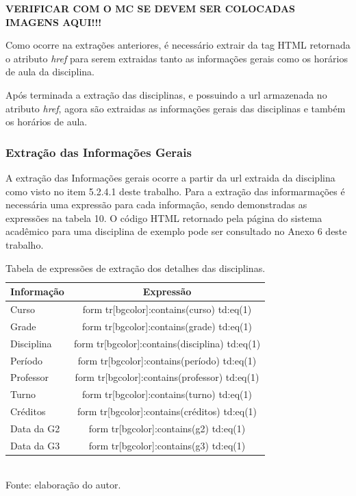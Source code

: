 \textbf{VERIFICAR COM O MC SE DEVEM SER COLOCADAS IMAGENS AQUI!!!}

Como ocorre na extrações anteriores, é necessário extrair da tag HTML retornada o atributo \emph{href} para serem extraidas tanto as informações gerais como os horários de aula da disciplina.

Após terminada a extração das disciplinas, e possuindo a url armazenada no atributo \emph{href}, agora são extraidas as informações gerais das disciplinas e também os horários de aula.

\subsubsection{Extração das Informações Gerais}
A extração das Informações gerais ocorre a partir da url extraida da disciplina como visto no item 5.2.4.1 deste trabalho. Para a extração das informarmações é necessária uma expressão para cada informação, sendo demonstradas as expressões na tabela 10. O código HTML retornado pela página do sistema acadêmico para uma disciplina de exemplo pode ser consultado no Anexo 6 deste trabalho.

\begin{table}[!hbt]
\centering
\caption[Extração de Informações - Expressões de Extração dos Detalhes da Disciplina]{Tabela de expressões de extração dos detalhes das disciplinas.}
\vspace{3mm}
\begin{tabular}{p{3cm}|c}\hline
\bf{Informação} & \bf{Expressão}                                 \\ \hline
Curso           & form tr[bgcolor]:contains(curso) td:eq(1)      \\ \hline
Grade           & form tr[bgcolor]:contains(grade) td:eq(1)      \\ \hline
Disciplina      & form tr[bgcolor]:contains(disciplina) td:eq(1) \\ \hline
Período         & form tr[bgcolor]:contains(período) td:eq(1)    \\ \hline
Professor       & form tr[bgcolor]:contains(professor) td:eq(1)  \\ \hline
Turno           & form tr[bgcolor]:contains(turno) td:eq(1)      \\ \hline
Créditos        & form tr[bgcolor]:contains(créditos) td:eq(1)   \\ \hline
Data da G2      & form tr[bgcolor]:contains(g2) td:eq(1)         \\ \hline
Data da G3      & form tr[bgcolor]:contains(g3) td:eq(1)         \\ \hline
\end{tabular}
\\ Fonte: elaboração do autor.
\end{table}


